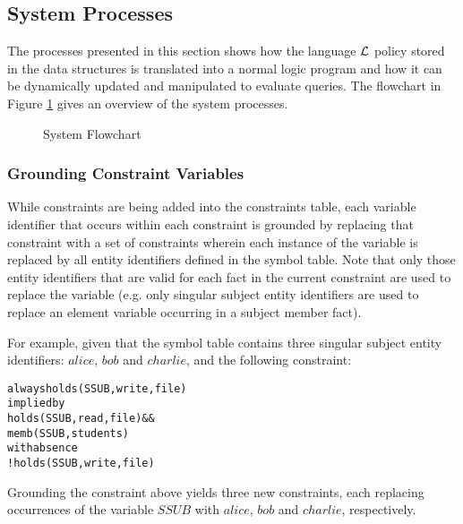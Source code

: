 \documentclass[11pt, twocolumn]{article}
\newenvironment{vverbatim}
  {\begin{alltt}}
  {\vspace{-\baselineskip}\end{alltt}}
\begin{document}
    \subsection{System Processes}

      The processes presented in this section shows how the language
      ${\cal L}$ policy stored in the data structures is translated into a
      normal logic program and how it can be dynamically updated and
      manipulated to evaluate queries. The flowchart in Figure \ref{fig-2}
      gives an overview of the system processes.

      \begin{figure}[ht]
        \begin{center}
          \caption{System Flowchart}
          \label{fig-2}
        \end{center}
      \end{figure}

      \subsubsection{Grounding Constraint Variables}

        While constraints are being added into the constraints table, each
        variable identifier that occurs within each constraint is grounded by
        replacing that constraint with a set of constraints wherein each
        instance of the variable is replaced by all entity identifiers defined
        in the symbol table. Note that only those entity identifiers that are
        valid for each fact in the current constraint are used to replace the
        variable (e.g. only singular subject entity identifiers are used to
        replace an element variable occurring in a subject member fact).

        For example, given that the symbol table contains three singular
        subject entity identifiers: $alice$, $bob$ and $charlie$, and the
        following constraint:

        \begin{vverbatim}
  always holds(SSUB, write, file)
    implied by
      holds(SSUB, read, file) &&
      memb(SSUB, students)
    with absence
      !holds(SSUB, write, file)
        \end{vverbatim}

        Grounding the constraint above yields three new constraints, each
        replacing occurrences of the variable $SSUB$ with $alice$, $bob$ and
        $charlie$, respectively.
\end{document}
